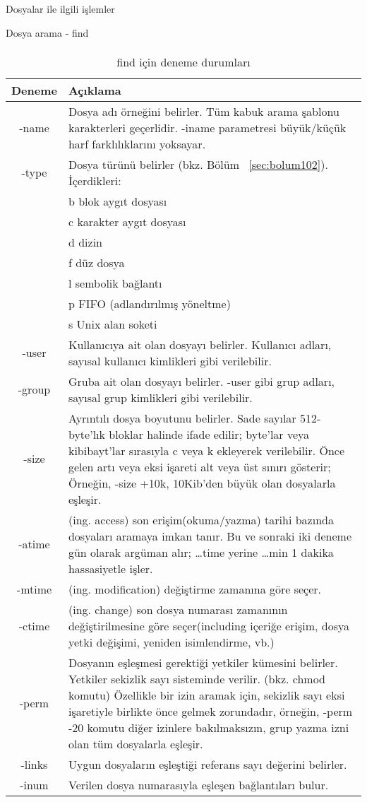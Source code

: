 \begin{section}{Dosyalar ile ilgili işlemler}
\begin{subsection}{Dosya arama - find}
\paragraph{}{
\begin {table}[H]
\caption {find için deneme durumları} \label{tab:title} 
\begin{tabular}{c l}
\hline
Deneme & Açıklama \\
\hline
-name & Dosya adı örneğini belirler. Tüm kabuk arama şablonu karakterleri geçerlidir. -iname parametresi büyük/küçük harf farklılıklarını yoksayar. \\
-type & Dosya türünü belirler (bkz. Bölüm ~\ref{sec:bolum102}). İçerdikleri:\\
 & b blok aygıt dosyası\\
 & c karakter aygıt dosyası\\
 & d dizin\\
 & f düz dosya\\
 & l sembolik bağlantı\\
 & p FIFO (adlandırılmış yöneltme)\\
 & s Unix alan soketi\\
-user & Kullanıcıya ait olan dosyayı belirler. Kullanıcı adları, sayısal kullanıcı kimlikleri gibi verilebilir.\\
-group & Gruba ait olan dosyayı belirler. -user gibi grup adları, sayısal grup kimlikleri gibi verilebilir.\\
-size & Ayrıntılı dosya boyutunu belirler. Sade sayılar 512-byte'lık bloklar halinde ifade edilir; byte'lar veya kibibayt'lar sırasıyla c veya k ekleyerek verilebilir. Önce gelen artı veya eksi işareti alt veya üst sınırı gösterir; Örneğin, -size +10k, 10Kib'den büyük olan dosyalarla eşleşir.\\
-atime & (ing. access) son erişim(okuma/yazma) tarihi bazında dosyaları aramaya imkan tanır.  Bu ve sonraki iki deneme gün olarak argüman alır; …time yerine …min 1 dakika hassasiyetle işler.\\
-mtime & (ing. modification) değiştirme zamanına göre seçer.\\
-ctime & (ing. change) son dosya numarası zamanının değiştirilmesine göre seçer(including içeriğe erişim, dosya yetki değişimi, yeniden isimlendirme, vb.)\\
-perm & Dosyanın eşleşmesi gerektiği yetkiler kümesini belirler. Yetkiler sekizlik sayı sisteminde verilir. (bkz. chmod komutu)
Özellikle bir izin aramak için, sekizlik sayı eksi işaretiyle birlikte önce gelmek zorundadır, örneğin, -perm -20 komutu diğer izinlere bakılmaksızın, grup yazma izni olan tüm dosyalarla eşleşir.\\
-links & Uygun dosyaların eşleştiği referans sayı değerini belirler.\\
-inum & Verilen dosya numarasıyla eşleşen bağlantıları bulur.\\
\hline
\end{tabular}
\end {table}
}

\end{subsection}
\end{section}
